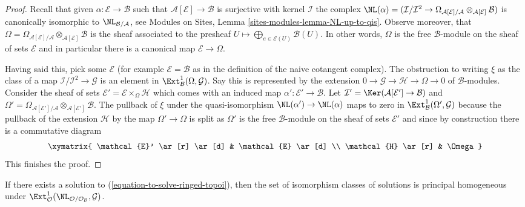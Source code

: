 \begin{proof}
Recall that given $\alpha : \mathcal{E} \to \mathcal{B}$
such that $\mathcal{A}[\mathcal{E}] \to \mathcal{B}$ is surjective
with kernel $\mathcal{I}$ the complex
$\NL(\alpha) = (\mathcal{I}/\mathcal{I}^2 \to 
\Omega_{\mathcal{A}[\mathcal{E}]/\mathcal{A}}
\otimes_{\mathcal{A}[\mathcal{E}]} \mathcal{B})$ is canonically
isomorphic to $\NL_{\mathcal{B}/\mathcal{A}}$, see
Modules on Sites, Lemma \ref{sites-modules-lemma-NL-up-to-qis}.
Observe moreover, that
$\Omega = \Omega_{\mathcal{A}[\mathcal{E}]/\mathcal{A}}
\otimes_{\mathcal{A}[\mathcal{E}]} \mathcal{B}$ is the sheaf
associated to the presheaf
$U \mapsto \bigoplus_{e \in \mathcal{E}(U)} \mathcal{B}(U)$.
In other words, $\Omega$ is the free $\mathcal{B}$-module on the
sheaf of sets $\mathcal{E}$ and in particular there is a canonical
map $\mathcal{E} \to \Omega$.

\medskip\noindent
Having said this, pick some $\mathcal{E}$ (for example
$\mathcal{E} = \mathcal{B}$ as in the definition of the naive cotangent
complex). The obstruction to writing $\xi$ as the class of a map
$\mathcal{I}/\mathcal{I}^2 \to \mathcal{G}$ is an element in
$\Ext^1_\mathcal{B}(\Omega, \mathcal{G})$. Say this is represented
by the extension $0 \to \mathcal{G} \to \mathcal{H} \to \Omega \to 0$
of $\mathcal{B}$-modules. Consider the sheaf of sets
$\mathcal{E}' = \mathcal{E} \times_\Omega \mathcal{H}$
which comes with an induced map $\alpha' : \mathcal{E}' \to \mathcal{B}$.
Let $\mathcal{I}' = \Ker(\mathcal{A}[\mathcal{E}'] \to \mathcal{B})$
and $\Omega' = \Omega_{\mathcal{A}[\mathcal{E}']/\mathcal{A}}
\otimes_{\mathcal{A}[\mathcal{E}']} \mathcal{B}$.
The pullback of $\xi$ under the quasi-isomorphism
$\NL(\alpha') \to \NL(\alpha)$ maps to zero in
$\Ext^1_\mathcal{B}(\Omega', \mathcal{G})$
because the pullback of the extension $\mathcal{H}$
by the map $\Omega' \to \Omega$ is split as $\Omega'$ is the free
$\mathcal{B}$-module on the sheaf of sets $\mathcal{E}'$ and since
by construction there is a commutative diagram
$$
\xymatrix{
\mathcal{E}' \ar[r] \ar[d] & \mathcal{E} \ar[d] \\
\mathcal{H} \ar[r] & \Omega
}
$$
This finishes the proof.
\end{proof}

\begin{lemma}
\label{lemma-choices-ringed-topoi}
If there exists a solution to (\ref{equation-to-solve-ringed-topoi}),
then the set of isomorphism classes of solutions is principal homogeneous
under $\Ext^1_\mathcal{O}(
\NL_{\mathcal{O}/\mathcal{O}_\mathcal{B}}, \mathcal{G})$.
\end{lemma}


